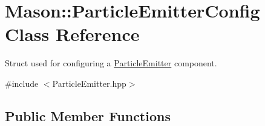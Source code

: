 \hypertarget{struct_mason_1_1_particle_emitter_config}{}\section{Mason\+:\+:Particle\+Emitter\+Config Class Reference}
\label{struct_mason_1_1_particle_emitter_config}


Struct used for configuring a \hyperlink{class_mason_1_1_particle_emitter}{Particle\+Emitter} component.  




{\ttfamily \#include $<$Particle\+Emitter.\+hpp$>$}

\subsection*{Public Member Functions}
